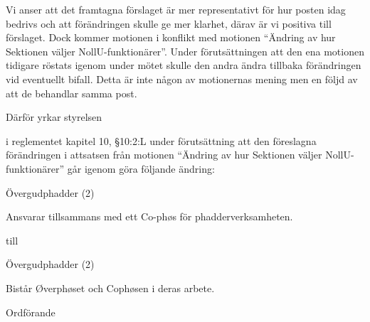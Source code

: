\documentclass[../_main/handlingar.tex]{subfiles}
\begin{document}
\motionssvar

Vi anser att det framtagna förslaget är mer representativt för hur posten idag bedrivs och att förändringen skulle ge mer klarhet, därav är vi positiva till förslaget. Dock kommer motionen i konflikt med motionen “Ändring av hur Sektionen väljer NollU-funktionärer”. Under förutsättningen att den ena motionen tidigare röstats igenom under mötet skulle den andra ändra tillbaka förändringen vid eventuellt bifall. Detta är inte någon av motionernas mening men en följd av att de behandlar samma post. 


Därför yrkar styrelsen 
\begin{attsatser}
    \att i reglementet kapitel 10, §10:2:L under förutsättning att den föreslagna förändringen i attsatsen från motionen “Ändring av hur Sektionen väljer NollU-funktionärer” går igenom göra följande ändring:
    \par
  \begin{emptylist}
    \item Övergudphadder (2)
      \begin{dashlist}
        \item Ansvarar tillsammans med ett Co-phøs för phadderverksamheten.
      \end{dashlist}
    \end{emptylist}
    
    till 
    
    \begin{emptylist}
        \item Övergudphadder (2)
        \begin{dashlist}
          \item {Bistår Øverphøset och Cophøsen i deras arbete.}
        \end{dashlist}
    \end{emptylist}
  \changenote
\end{attsatser}


\begin{signatures}{1}
    \ist
    \signature{\ordf}{Ordförande}
\end{signatures}
\end{document}
